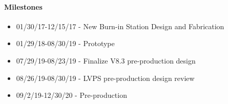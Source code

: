 \paragraph{Milestones}
\begin{itemize}[noitemsep,nolistsep]
\item{ 01/30/17-12/15/17 - New Burn-in Station Design and Fabrication}
\item{ 01/29/18-08/30/19 - Prototype }
\item{ 07/29/19-08/23/19 - Finalize  V8.3 pre-production design}
\item{ 08/26/19-08/30/19 - LVPS pre-production design review}
\item{ 09/2/19-12/30/20  - Pre-production}
\end{itemize}
